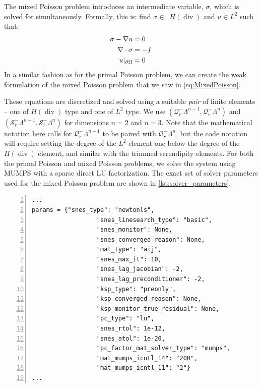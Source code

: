 \documentclass[format=acmsmall,screen,timestamp=false,a4paper]{acmart}
\DeclareMathOperator{\Div}{div}
\newcommand{\calQ}{\mathcal{Q}}
\newcommand{\calS}{\mathcal{S}}
\newcommand{\hdiv}{\ensuremath{{H}(\Div)}\xspace}
\begin{document}
The mixed Poisson problem introduces an intermediate variable, $\sigma$, which is solved for simultaneously.
Formally, this is: find $\sigma\in$~\hdiv and $u\in L^2$ such that:
\begin{align}
     \sigma - \nabla u &= 0 \notag \\
     \nabla \cdot \sigma &= -f \notag \\
     u\vert_{\partial \Omega} &= 0 \notag
\end{align}
In a similar fashion as for the primal Poisson problem, we can create the weak formulation of the mixed Poisson problem that we saw in \cref{eq:MixedPoisson}.  %

These equations are discretized and solved using a suitable \textit{pair} of finite elements -- one of \hdiv type and one of $L^2$ type.  We use $(\calQ_r^-\Lambda^{n-1},\calQ_r^-\Lambda^n)$ and $(\calS_r^-\Lambda^{n-1},\calS_r^-\Lambda^n)$ for dimensions $n=2$ and $n=3$.  Note that the mathematical notation here calls for $\mathcal{Q}^-_r \Lambda^{n-1}$ to be paired with $\mathcal{Q}^-_r \Lambda^n$, but the code notation will require setting the degree of the $L^2$ element one below the degree of the \hdiv element, and similar with the trimmed serendipity elements.
For both the primal Poisson and mixed Poisson problems, we solve the system using MUMPS with a sparse direct LU factorization.
The exact set of solver parameters used for the mixed Poisson problem are shown in \cref{lst:solver_parameters}.

\begin{lstlisting}[float=htbp,caption={An example of some solver parameters that we can use for the mixed Poisson problem.}, label={lst:solver_parameters}, numbers=left, firstnumber=1, xleftmargin=20pt,  xrightmargin=20pt]
...
params = {"snes_type": "newtonls",
                  "snes_linesearch_type": "basic",
                  "snes_monitor": None,
                  "snes_converged_reason": None,
                  "mat_type": "aij",
                  "snes_max_it": 10,
                  "snes_lag_jacobian": -2,
                  "snes_lag_preconditioner": -2,
                  "ksp_type": "preonly",
                  "ksp_converged_reason": None,
                  "ksp_monitor_true_residual": None,
                  "pc_type": "lu",
                  "snes_rtol": 1e-12,
                  "snes_atol": 1e-20,
                  "pc_factor_mat_solver_type": "mumps",
                  "mat_mumps_icntl_14": "200",
                  "mat_mumps_icntl_11": "2"}
...
\end{lstlisting}
\end{document}
